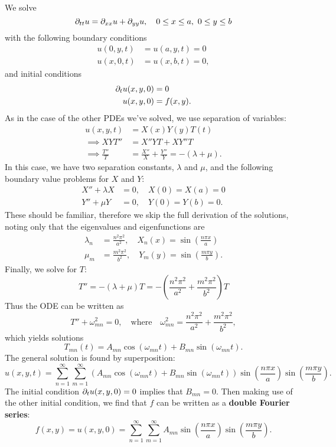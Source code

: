 \begin{enumerate}
	We solve
	\[
	\partial_{tt}u = \partial_{xx}u + \partial_{yy}u, \quad 0 \leq x \leq a, \,\, 0 \leq y \leq b
	\]
	with the following boundary conditions
	\begin{align*}
		u(0,y,t) &= u(a,y,t) = 0 \\
		u(x,0,t) &= u(x,b,t) = 0,
	\end{align*}
	and initial conditions
	\begin{align*}
		\partial_tu(x,y,0) &= 0 \\
		u(x,y,0) &= f(x,y).
	\end{align*}
	As in the case of the other PDEs we've solved, we use separation of variables:
	\begin{align*}
		u(x,y,t) &= X(x)Y(y)T(t) \\
		\implies XYT'' &= X''YT + XY''T \\
		\implies \frac{T''}{T} &= \frac{X''}{X} + \frac{Y''}{Y} = -(\lambda + \mu).
	\end{align*}
	In this case, we have two separation constants, $\lambda$ and $\mu$, and the following boundary value problems for $X$ and $Y$:
	\begin{align*}
		X'' + \lambda X &= 0, \quad X(0) = X(a) = 0 \\
		Y'' + \mu Y &= 0, \quad Y(0) = Y(b) = 0.
	\end{align*}
	These should be familiar, therefore we skip the full derivation of the solutions, noting only that the eigenvalues and eigenfunctions are
	\begin{align*}
		\lambda_n &= \frac{n^2\pi^2}{a^2}, \quad X_n(x) = \sin\left(\frac{n\pi x}{a}\right) \\
		\mu_m &= \frac{m^2\pi^2}{b^2}, \quad Y_m(y) = \sin\left(\frac{m\pi y}{b}\right).
	\end{align*}
	Finally, we solve for $T$:
	\[
	T'' = -(\lambda + \mu)T = -\left(\frac{n^2\pi^2}{a^2} + \frac{m^2\pi^2}{b^2}\right)T
	\]
	Thus the ODE can be written as
	\[
	T'' + \omega^2_{mn} = 0, \quad\text{where}\quad \omega^2_{mn} = \frac{n^2\pi^2}{a^2} + \frac{m^2\pi^2}{b^2},
	\]
	which yields solutions
	\[
	T_{mn}(t) = A_{mn}\cos(\omega_{mn}t) + B_{mn}\sin(\omega_{mn}t).
	\]
	The general solution is found by superposition:
	\[
	u(x,y,t) = \sum_{n=1}^{\infty} \sum_{m=1}^{\infty} \left(A_{mn}\cos(\omega_{mn}t) + B_{mn}\sin(\omega_{mn}t) \right) \sin\left(\frac{n\pi x}{a}\right) \sin\left(\frac{m\pi y}{b}\right).
	\]
	The initial condition $\partial_tu(x,y,0) = 0$ implies that $B_{mn} = 0$. Then making use of the other initial condition, we find that $f$ can be written as a \textbf{double Fourier series}:
	\[
	f(x,y) = u(x,y,0) = \sum_{n=1}^{\infty} \sum_{m=1}^{\infty} A_{mn} \sin\left(\frac{n\pi x}{a}\right) \sin\left(\frac{m\pi y}{b}\right).
	\]
	

\end{enumerate}
